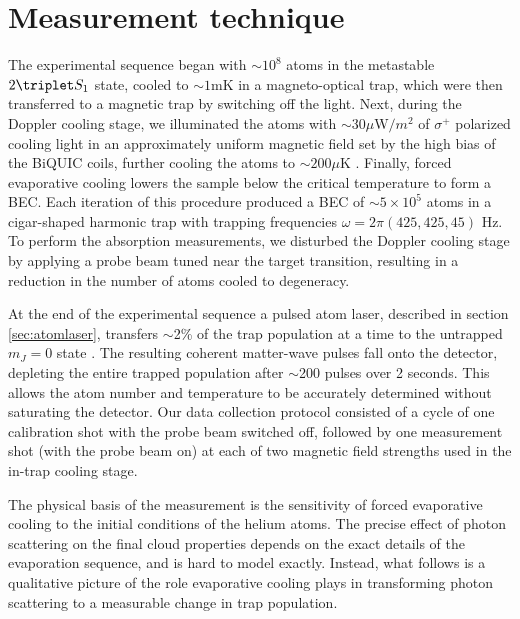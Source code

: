 \section{Measurement technique}

	The experimental sequence began with $\sim10^8$ atoms in the metastable $2\triplet S_1$ state, cooled to  $\sim1 \textrm{mK}$ in a magneto-optical trap, which were then transferred to a magnetic trap by switching off the light.
	Next, during the Doppler cooling stage, we illuminated the atoms with $\sim$30$\mu$W$/m^2$ of $\sigma^+$ polarized cooling light in an approximately uniform magnetic field set by the high bias of the BiQUIC coils, further cooling the atoms to $\sim200\mu \textrm{K}$ .
	Finally, forced evaporative cooling lowers the sample below the critical temperature to form a BEC.
	Each iteration of this procedure produced a BEC of $\sim 5\times10^5$ atoms in a cigar-shaped harmonic trap with trapping frequencies $\omega = 2\pi (425,425,45)$ Hz.
	To perform the absorption measurements, we disturbed the Doppler cooling stage by applying a probe beam tuned near the target transition, resulting in a reduction in the number of atoms cooled to degeneracy. 
	

	At the end of the experimental sequence a pulsed atom laser, described in section \ref{sec:atomlaser}, transfers $\sim$2\% of the trap population at a time to the untrapped $m_J=0$ state \cite{Manning10,Henson18_BCR}.
	The resulting coherent matter-wave pulses fall onto the detector, {depleting the entire trapped population after $\sim$200 pulses over 2 seconds.
	This allows}  the atom number and temperature to be accurately determined without saturating the detector.
	Our data collection protocol consisted of a cycle of one calibration shot with the probe beam switched off, followed by one measurement shot (with the probe beam on) at each of two magnetic field strengths used in the in-trap cooling stage.
	
	The physical basis of the measurement is the sensitivity of forced evaporative cooling to the initial conditions of the helium atoms.
	The precise effect of photon scattering on the final cloud properties depends on the exact details of the evaporation sequence, and is hard to model exactly.
	Instead, what follows is a qualitative picture of the role evaporative cooling plays in transforming photon scattering to a measurable change in trap population.

